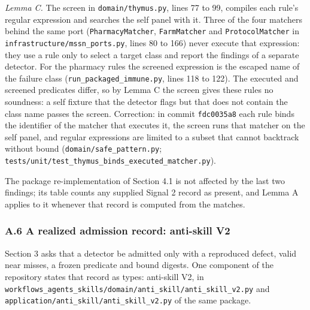 \documentclass[
  11pt,
]{article}
\newcommand{\passthrough}[1]{#1}
\begin{document}
\emph{Lemma C.} The screen in
\texttt{\nolinkurl{domain/thymus.py}}, lines 77 to 99, compiles
each rule's regular expression and searches the self panel with it.
Three of the four matchers behind the same port
(\passthrough{\lstinline!PharmacyMatcher!},
\passthrough{\lstinline!FarmMatcher!} and
\passthrough{\lstinline!ProtocolMatcher!} in
\texttt{\nolinkurl{infrastructure/mssn_ports.py}}, lines 80 to
166) never execute that expression: they use a rule only to select a
target class and report the findings of a separate detector. For the
pharmacy rules the screened expression is the escaped name of the
failure class (\texttt{\nolinkurl{run_packaged_immune.py}}, lines
118 to 122). The executed and screened predicates differ, so by Lemma C
the screen gives these rules no soundness: a self fixture that the
detector flags but that does not contain the class name passes the
screen. Correction: in commit \passthrough{\lstinline!fdc0035a8!} each
rule binds the identifier of the matcher that executes it, the screen
runs that matcher on the self panel, and regular expressions are limited
to a subset that cannot backtrack without bound
(\texttt{\nolinkurl{domain/safe_pattern.py}};
\texttt{\nolinkurl{tests/unit/test_thymus_binds_executed_matcher.py}}).

The package re-implementation of Section 4.1 is not affected by the last
two findings; its table counts any supplied Signal 2 record as present,
and Lemma A applies to it whenever that record is computed from the
matches.

\hypertarget{a.6-a-realized-admission-record-anti-skill-v2}{%
\subsubsection{A.6 A realized admission record: anti-skill
V2}\label{a.6-a-realized-admission-record-anti-skill-v2}}

Section 3 asks that a detector be admitted only with a reproduced
defect, valid near misses, a frozen predicate and bound digests. One
component of the repository states that record as types: anti-skill V2,
in
\texttt{\nolinkurl{workflows_agents_skills/domain/anti_skill/anti_skill_v2.py}}
and \texttt{\nolinkurl{application/anti_skill/anti_skill_v2.py}}
of the same package.
\end{document}
